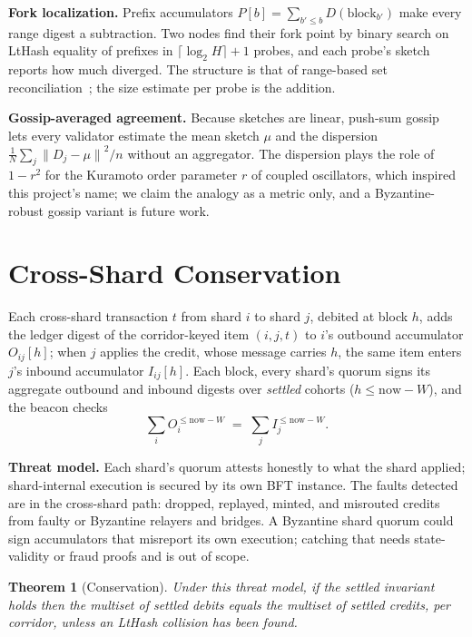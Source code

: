 \documentclass[journal]{IEEEtran}
\newtheorem{theorem}{Theorem}
\newcommand{\norm}[1]{\ensuremath{\lVert #1 \rVert}}
\begin{document}
\textbf{Fork localization.} Prefix accumulators $P[b] = \sum_{b' \le b}
D(\mathrm{block}_{b'})$ make every range digest a subtraction. Two nodes
find their fork point by binary search on LtHash equality of prefixes in
$\lceil \log_{2} H \rceil + 1$ probes, and each probe's sketch reports how
much diverged. The structure is that of range-based set
reconciliation~\cite{meyer2023rbsr}; the size estimate per probe is the
addition.

\textbf{Gossip-averaged agreement.} Because sketches are linear, push-sum
gossip~\cite{kempe2003gossip} lets every validator estimate the mean
sketch $\mu$ and the dispersion $\frac{1}{N}\sum_{j}\norm{D_{j} -
\mu}^{2}/n$ without an aggregator. The dispersion plays the role of
$1 - r^{2}$ for the Kuramoto order parameter $r$ of coupled oscillators,
which inspired this project's name; we claim the analogy as a metric
only, and a Byzantine-robust gossip variant is future work.

\section{Cross-Shard Conservation}
\label{sec:conservation}

Each cross-shard transaction $t$ from shard $i$ to shard $j$, debited at
block $h$, adds the ledger digest of the corridor-keyed item
$(i, j, t)$ to $i$'s outbound accumulator $O_{ij}[h]$; when $j$ applies
the credit, whose message carries $h$, the same item enters $j$'s inbound
accumulator $I_{ij}[h]$. Each block, every shard's quorum signs its
aggregate outbound and inbound digests over \emph{settled} cohorts
($h \le \mathrm{now} - W$), and the beacon checks
\begin{equation}
\textstyle\sum_{i} O_{i}^{\le \mathrm{now} - W} \;=\;
\sum_{j} I_{j}^{\le \mathrm{now} - W}.
\end{equation}

\textbf{Threat model.} Each shard's quorum attests honestly to what the
shard applied; shard-internal execution is secured by its own BFT
instance. The faults detected are in the cross-shard path: dropped,
replayed, minted, and misrouted credits from faulty or Byzantine
relayers and bridges. A Byzantine shard quorum could sign accumulators
that misreport its own execution; catching that needs state-validity or
fraud proofs and is out of scope.

\begin{theorem}[Conservation]
\label{thm:conservation}
Under this threat model, if the settled invariant holds then the multiset
of settled debits equals the multiset of settled credits, per corridor,
unless an LtHash collision has been found.
\end{theorem}
\end{document}
